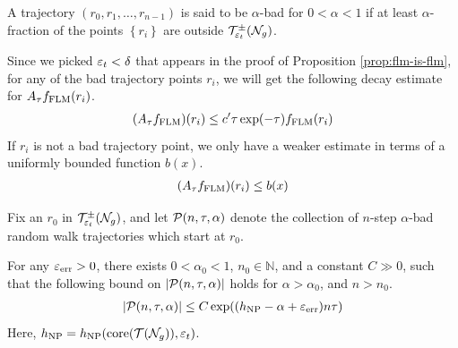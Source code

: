 \documentclass[12pt, reqno]{amsart}
\begin{document}
\begin{definition}
  A trajectory $\left( r_0, r_1, \ldots, r_{n-1} \right)$ is said to be $\alpha$-bad for $0 < \alpha < 1$ if at least $\alpha$-fraction of the points $\left\{ r_i \right\}$ are outside $\mathcal{T}_{\varepsilon_t}^{\pm}(\mathcal{N}_g)$.
\end{definition}
Since we picked $\varepsilon_t < \delta$ that appears in the proof of Proposition \ref{prop:flm-is-flm}, for any of the bad trajectory points $r_i$, we will get the following decay estimate for $A_{\tau}f_{\mathrm{FLM}}(r_i)$.
\begin{align*}
  (A_{\tau} f_{\mathrm{FLM}})(r_i) \leq c^{\prime} \tau \exp(-\tau) f_{\mathrm{FLM}}(r_i)
\end{align*}
If $r_i$ is not a bad trajectory point, we only have a weaker estimate in terms of a uniformly bounded function $b(x)$.
\begin{align*}
  (A_{\tau} f_{\mathrm{FLM}})(r_i) \leq b(x)
\end{align*}


Fix an $r_0$ in $\mathcal{T}_{\varepsilon_t}^{\pm}(\mathcal{N}_g)$, and let $\mathcal{P}(n, \tau, \alpha)$ denote the collection of $n$-step $\alpha$-bad random walk trajectories which start at $r_0$.

\begin{proposition}
  For any $\varepsilon_{\mathrm{err}} > 0$, there exists $0 < \alpha_0 < 1$, $n_0 \in \mathbb{N}$, and a constant $C \gg 0$,  such that the following bound on $\left| \mathcal{P}(n, \tau, \alpha) \right|$ holds for $\alpha > \alpha_0$, and $n > n_0$.
  \begin{align*}
    \left| \mathcal{P}(n, \tau, \alpha) \right| \leq C \exp((h_{\mathrm{NP}} - \alpha + \varepsilon_{\mathrm{err}})n\tau)
  \end{align*}
  Here, $h_{\mathrm{NP}} = h_{\mathrm{NP}}(\mathrm{core}(\mathcal{T}(\mathcal{N}_g)), \varepsilon_t)$.
\end{proposition}
\end{document}
